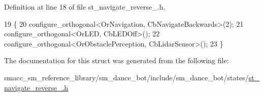 Definition at line 18 of file st\+\_\+navigate\+\_\+reverse\+\_.\+h.


\begin{DoxyCode}
19    \{
20       configure\_orthogonal<OrNavigation, CbNavigateBackwards>(2);
21       configure\_orthogonal<OrLED, CbLEDOff>();
22       configure\_orthogonal<OrObstaclePerception, CbLidarSensor>();
23    \}
\end{DoxyCode}


The documentation for this struct was generated from the following file\+:\begin{DoxyCompactItemize}
\item 
smacc\+\_\+sm\+\_\+reference\+\_\+library/sm\+\_\+dance\+\_\+bot/include/sm\+\_\+dance\+\_\+bot/states/\hyperlink{include_2sm__dance__bot_2states_2st__navigate__reverse__3_8h}{st\+\_\+navigate\+\_\+reverse\+\_.\+h}\end{DoxyCompactItemize}
